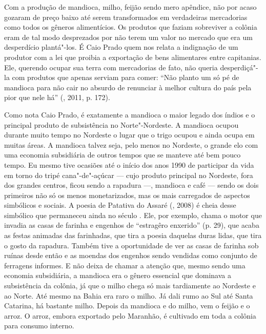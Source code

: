 Com a produção de mandioca, milho, feijão sendo mero apêndice, não por
acaso gozaram de preço baixo até serem transformados em verdadeiras
mercadorias como todos os gêneros alimentícios. Os produtos que faziam
sobreviver a colônia eram de tal modo desprezados por não terem um valor
no mercado que era um desperdício plantá"-los. É Caio Prado quem nos
relata a indignação de um produtor com a lei que proibia a exportação de
bens alimentares entre capitanias. Ele, querendo ocupar sua terra com
mercadorias de fato, não queria desperdiçá"-la com produtos que apenas
serviam para comer: ``Não planto um só pé de mandioca para não cair no
absurdo de renunciar à melhor cultura do país pela pior que nele há''
(, 2011, p. 172).

Como nota Caio Prado, é exatamente a mandioca o maior legado dos índios
e o principal produto de subsistência no Norte"-Nordeste. A mandioca
ocupou durante muito tempo no Nordeste o lugar que o trigo ocupou e
ainda ocupa em muitas áreas. A mandioca talvez seja, pelo menos no
Nordeste, o grande elo com uma economia subsidiária de outros tempos que
se manteve até bem pouco tempo. Eu mesmo tive ocasiões até o início dos
anos 1990 de participar da vida em torno do tripé cana"-de"-açúcar --- cujo
produto principal no Nordeste, fora dos grandes centros, ficou sendo a
rapadura ---, mandioca e café --- sendo os dois primeiros não só os menos
monetarizados, mas os mais carregados de aspectos simbólicos e sociais.
A poesia de Patativa do Assaré (, 2008) é cheia desse simbólico
que permaneceu ainda no século . Ele, por exemplo, chama o motor que
invadia as casas de farinha e engenhos de ``estragêro enxerido'' (p.
29), que acaba as festas animadas das farinhadas, que tira a poesia
daquelas duras lidas, que tira o gosto da rapadura. Também tive a
oportunidade de ver as casas de farinha sob ruínas desde então e as
moendas dos engenhos sendo vendidas como conjunto de ferragens informes.
E não deixa de chamar a atenção que, mesmo sendo uma economia
subsidiária, a mandioca era o gênero essencial que dominava a
subsistência da colônia, já que o milho chega só mais tardiamente ao
Nordeste e ao Norte. Até mesmo na Bahia era raro o milho. Já dali rumo
ao Sul até Santa Catarina, há bastante milho. Depois da mandioca e do
milho, vem o feijão e o arroz. O arroz, embora exportado pelo Maranhão,
é cultivado em toda a colônia para consumo interno.

